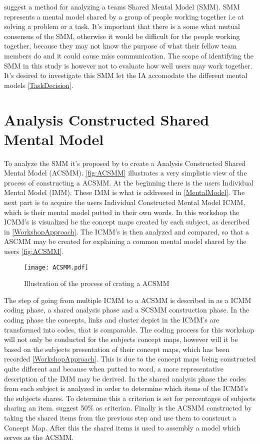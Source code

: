 \textcite{WEB:ConceptMapAnalysis} suggest a method for analyzing a teams Shared Mental Model (SMM). SMM represents a mental model shared by a group of people working together i.e  at solving a problem or a task. It's important that there is a some what mutual consensus of the SMM, otherwise it would be difficult for the people working together, because they may not know the purpose of what their fellow team members do and it could cause miss communication. The scope of identifying the SMM in this study is however not to evaluate how well users may work together. It's desired to investigate this SMM let the IA accomodate the different mental models \autoref{TaskDecision}.


\section{Analysis Constructed Shared Mental Model}
\label{ACSMM}
To analyze the SMM it's proposed by \textcite{WEB:ConceptMapAnalysis} to create a Analysis Constructed Shared Mental Model (ACSMM). \autoref{fig:ACSMM} illustrates a very simplistic view of the process of constructing a ACSMM. At the beginning there is the users Individual Mental Model (IMM). These IMM is what is addressed in \autoref{MentalModel}. The next part is to acquire the users Individual Constructed Mental Model ICMM, which is their mental model putted in their own words. In this workshop the ICMM's is visualized be the concept maps created by each subject, as described in \autoref{WorkshopApproach}. The ICMM's is then analyzed and compared, so that a ASCMM may be created for explaining a common mental model shared by the users \autoref{fig:ACSMM}.  

\begin{figure}[H]
	\centering
	\texttt{[image: ACSMM.pdf]}
	\caption{Illustration of the process of crating a ACSMM}
	\label{fig:ACSMM}
\end{figure}

The step of going from multiple ICMM to a ACSMM is described in \textcite{WEB:ConceptMapAnalysis} as a ICMM coding phase, a shared analysis phase and a SCSMM construction phase. In the coding phase the concepts, links and cluster depict in the ICMM's are transformed into codes, that is comparable. The coding process for this workshop will not only be conducted for the subjects concept maps, however will it be based on the subjects presentation of their concept maps, which has been recorded \autoref{WorkshopApproach}. This is due to the concept maps being constructed quite different and because when putted to word, a more representative description of the IMM may be derived. In the shared analysis phase the codes from each subject is analyzed in order to determine which items of the ICMM's the subjects shares. To determine this a criterion is set for percentages of subjects sharing an item. \textcite{WEB:ConceptMapAnalysis} suggest 50\% as criterion. Finally is the ACSMM constructed by taking the shared items from the previous step and use them to construct a Concept Map. After this the shared items is used to assembly a model which serves as the ACSMM. 


